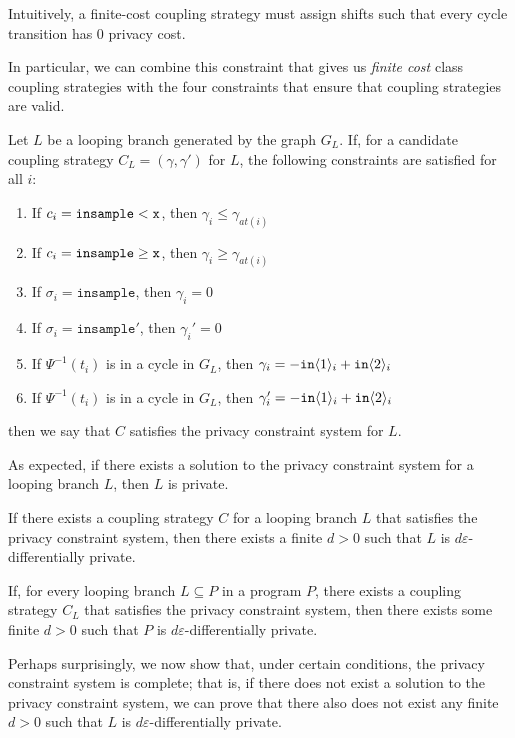 Intuitively, a finite-cost coupling strategy must assign shifts such that every cycle transition has 0 privacy cost. 

In particular, we can combine this constraint that gives us \textit{finite cost} class coupling strategies with the four constraints that ensure that coupling strategies are valid.

\begin{defn}\label{privacyConstraintSystem}
    Let $L$ be a looping branch generated by the graph $G_L$. If, for a candidate coupling strategy $C_L = (\gamma, \gamma')$ for $L$, the following constraints are satisfied for all $i$: \begin{enumerate}
        \item If $c_i = \lguard[\texttt{x}]$, then $\gamma_i\leq\gamma_{at(i)}$
        \item If $c_i = \gguard[\texttt{x}]$, then $\gamma_i\geq\gamma_{at(i)}$
        \item If $\sigma_i = \texttt{insample}$, then $\gamma_i=0$
        \item If $\sigma_i = \texttt{insample}'$, then $\gamma_i'=0$
        \item If $\Psi^{-1}(t_i)$ is in a cycle in $G_L$, then $\gamma_i = -\texttt{in}\brangle{1}_i+\texttt{in}\brangle{2}_i$
        \item If $\Psi^{-1}(t_i)$ is in a cycle in $G_L$, then $\gamma_i' = -\texttt{in}\brangle{1}_i+\texttt{in}\brangle{2}_i$
    \end{enumerate}
    then we say that $C$ satisfies the privacy constraint system for $L$. 
\end{defn}

As expected, if there exists a solution to the privacy constraint system for a looping branch $L$, then $L$ is private.

\begin{prop}\label{privacyFiniteCostProp}
    If there exists a coupling strategy $C$ for a looping branch $L$ that satisfies the privacy constraint system, then there exists a finite $d>0$ such that $L$ is $d\varepsilon$-differentially private. 
\end{prop}

\begin{cor}
    If, for every looping branch $L\subseteq P$ in a program $P$, there exists a coupling strategy $C_L$ that satisfies the privacy constraint system, then there exists some finite $d>0$ such that $P$ is $d\varepsilon$-differentially private.    
\end{cor}

Perhaps surprisingly, we now show that, under certain conditions, the privacy constraint system is complete; that is, if there does not exist a solution to the privacy constraint system, we can prove that there also does not exist any finite $d>0$ such that $L$ is $d\varepsilon$-differentially private. 